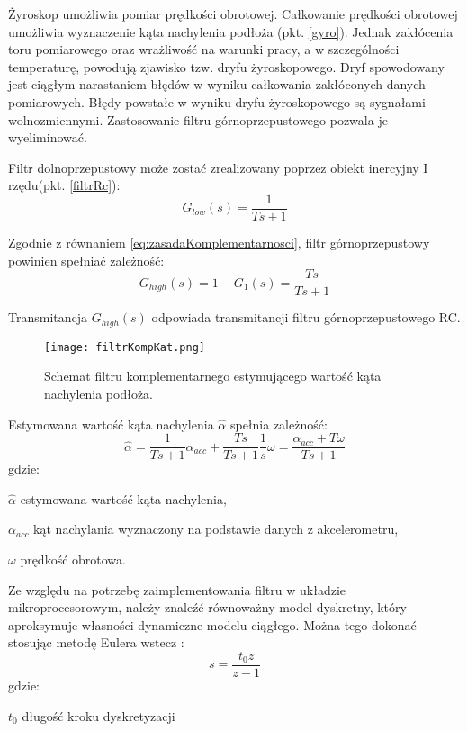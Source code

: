 Żyroskop umożliwia pomiar prędkości obrotowej. Całkowanie prędkości obrotowej umożliwia wyznaczenie kąta nachylenia podłoża (pkt. \ref{gyro}). Jednak zakłócenia toru pomiarowego oraz wrażliwość na warunki pracy, a w szczególności temperaturę, powodują zjawisko tzw. dryfu żyroskopowego. Dryf spowodowany jest ciągłym narastaniem błędów w wyniku całkowania zakłóconych danych pomiarowych. Błędy powstałe w wyniku dryfu żyroskopowego są sygnałami wolnozmiennymi. Zastosowanie filtru górnoprzepustowego pozwala je wyeliminować. 

Filtr dolnoprzepustowy może zostać zrealizowany poprzez obiekt inercyjny I rzędu(pkt. \ref{filtrRc}):
\begin{equation}
    G_{low}(s)=\frac{1}{Ts+1}
    \label{eq:lowPass}
\end{equation}

Zgodnie z równaniem \ref{eq:zasadaKomplementarnosci}, filtr górnoprzepustowy powinien spełniać zależność:
\begin{equation}
    G_{high}(s)=1-G_{1}(s)=\frac{Ts}{Ts+1}
    \label{eq:highPass}
\end{equation}

Transmitancja $G_{high}(s)$ odpowiada transmitancji filtru górnoprzepustowego RC.

\begin{figure}[h]
    \centering
    \texttt{[image: filtrKompKat.png]}
    \caption{Schemat filtru komplementarnego estymującego wartość kąta nachylenia podłoża.}
    \label{fig:kompKat}
\end{figure}

Estymowana wartość kąta nachylenia $\hat{\alpha}$ spełnia zależność:
\begin{equation}
    \hat{\alpha} = \frac{1}{Ts+1}\alpha_{acc}+\frac{Ts}{Ts+1}\frac{1}{s}\omega = \frac{\alpha_{acc}+T\omega}{Ts + 1}
    \label{eq:alpha}
\end{equation}
gdzie:
\begin{eqwhere}[2cm]
	\item[$\hat{\alpha}$] estymowana wartość kąta nachylenia,
	\item[$\alpha_{acc}$] kąt nachylania wyznaczony na podstawie danych z akcelerometru,
	\item[$\omega$] prędkość obrotowa.
\end{eqwhere}

Ze względu na potrzebę zaimplementowania filtru w układzie mikroprocesorowym, należy znaleźć równoważny model dyskretny, który aproksymuje własności dynamiczne modelu ciągłego. Można tego dokonać stosując metodę Eulera wstecz \cite{grega}:
\begin{equation}
    s=\frac{t_0z}{z-1}
    \label{eq:eulerWstecz}
\end{equation}
gdzie:
\begin{eqwhere}[2cm]
	\item[$t_{0}$] długość kroku dyskretyzacji
\end{eqwhere}

